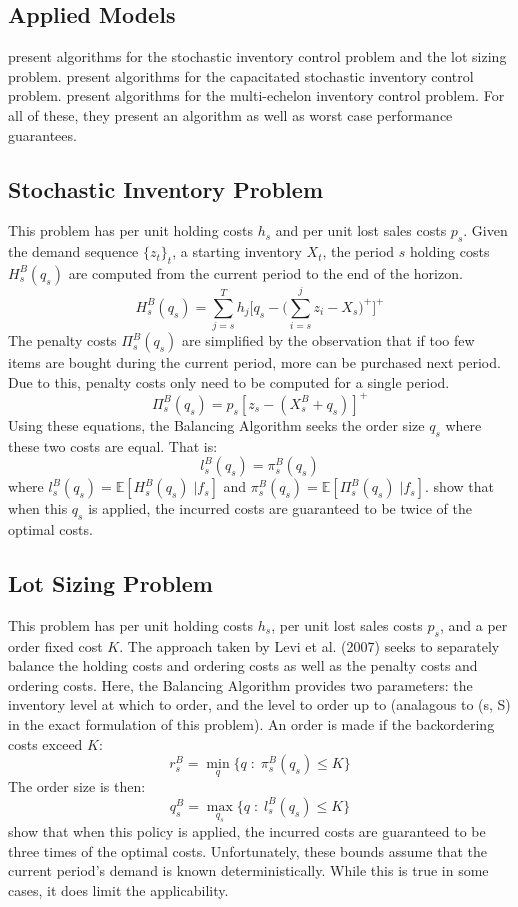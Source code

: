 \documentclass[12pt]{article}
\newcommand{\EX}{\mathbb{E}}
\begin{document}
\subsection{Applied Models}

\cite{levi:2007} present algorithms for the stochastic inventory control problem and the lot sizing problem. \cite{levi:2008} present algorithms for the capacitated stochastic inventory control problem. \cite{levi:2016} present algorithms for the multi-echelon inventory control problem. For all of these, they present an algorithm as well as worst case performance guarantees. 

\subsection{Stochastic Inventory Problem}

This problem has per unit holding costs $h_s$ and per unit lost sales costs $p_s$. Given the demand sequence $\{z_t\}_t$, a starting inventory $X_t$, the period $s$ holding costs $H^B_s(q_s)$ are computed from the current period to the end of the horizon. 
$$
	H_s^B(q_s) = \sum_{j=s}^T h_j \big[q_s - \big(\sum_{i=s}^j z_i - X_s\big)^+\big]^+
$$
The penalty costs $\Pi_s^B(q_s)$ are simplified by the observation that if too few items are bought during the current period, more can be purchased next period. Due to this, penalty costs only need to be computed for a single period.
$$
	\Pi_s^B(q_s) =  p_s [z_s - (X_s^B + q_s)]^+ 
$$
Using these equations, the Balancing Algorithm seeks the order size $q_s$ where these two costs are equal. That is:
$$
	l_s^B(q_s) = \pi_s^B(q_s)
$$
where $l_s^B(q_s) = \EX[H_s^B(q_s) \; | f_s]$ and $\pi_s^B(q_s) = \EX[\Pi_s^B(q_s) \; | f_s]$. \cite{levi:2007} show that when this $q_s$ is applied, the incurred costs are guaranteed to be twice of the optimal costs.

\subsection{Lot Sizing Problem}

This problem has per unit holding costs $h_s$, per unit lost sales costs $p_s$, and a per order fixed cost $K$. The approach taken by Levi et al. (2007) seeks to separately balance the holding costs and ordering costs as well as the penalty costs and ordering costs. Here, the Balancing Algorithm provides two parameters: the inventory level at which to order, and the level to order up to (analagous to (s, S) in the exact formulation of this problem). An order is made if the backordering costs exceed $K$:
$$
	r_s^B = \min_{q} \{q \; : \; \pi_s^B(q_s) \leq K\} 
$$
The order size is then:
$$
	q_s^B = \max_{q_s} \{q \; : \; l_s^B(q_s) \leq K\} 
$$
\cite{levi:2007} show that when this policy is applied, the incurred costs are guaranteed to be three times of the optimal costs. Unfortunately, these bounds assume that the current period's demand is known deterministically. While this is true in some cases, it does limit the applicability.
\end{document}

